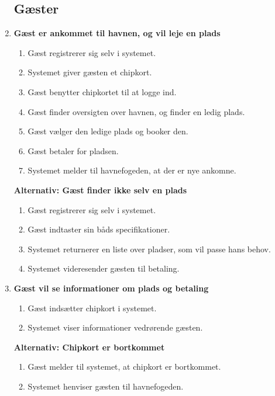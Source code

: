 \begin{enumerate}
\subsection{Gæster}

    \item{\bf{Gæst er ankommet til havnen, og vil leje en plads}}
      \begin{enumerate}
        \item Gæst registrerer sig selv i systemet.
        \item Systemet giver gæsten et chipkort.
        \item Gæst benytter chipkortet til at logge ind.
        \item Gæst finder oversigten over havnen, og finder en ledig plads.
        \item Gæst vælger den ledige plads og booker den.
        \item Gæst betaler for pladsen.
        \item Systemet melder til havnefogeden, at der er nye ankomne.
      \end{enumerate}

    \bf{Alternativ: Gæst finder ikke selv en plads}
      \begin{enumerate}
        \item Gæst registrerer sig selv i systemet.
        \item Gæst indtaster sin båds specifikationer.
        \item Systemet returnerer en liste over pladser, som vil passe hans behov.
        \item Systemet videresender gæsten til betaling.
      \end{enumerate}

    \item{\bf{Gæst vil se informationer om plads og betaling}}
      \begin{enumerate}
        \item Gæst indsætter chipkort i systemet.
        \item Systemet viser informationer vedrørende gæsten.
      \end{enumerate}

    \bf{Alternativ: Chipkort er bortkommet}
      \begin{enumerate}
        \item Gæst melder til systemet, at chipkort er bortkommet.
        \item Systemet henviser gæsten til havnefogeden.
      \end{enumerate}


\end{enumerate}
